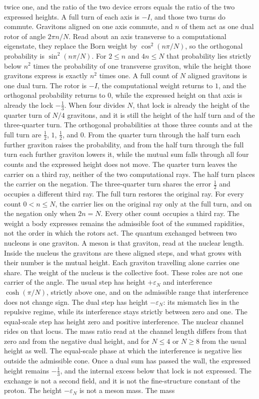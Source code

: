 \documentclass[a4paper]{article}
\begin{document}
twice one, and the ratio of the two device errors equals the ratio of the two expressed heights. A full turn of each axis is \(-I\), and those two turns do commute. Gravitons aligned on one axis commute, and \(n\) of them act as one dual rotor of angle \(2\pi n/N\). Read about an axis transverse to a computational eigenstate, they replace the Born weight by \(\cos^2(n\pi/N)\), so the orthogonal probability is \(\sin^2(n\pi/N)\). For \(2\le n\) and \(4n\le N\) that probability lies strictly below \(n^2\) times the probability of one transverse graviton, while the height those gravitons express is exactly \(n^2\) times one. A full count of \(N\) aligned gravitons is one dual turn. The rotor is \(-I\), the computational weight returns to \(1\), and the orthogonal probability returns to \(0\), while the expressed height on that axis is already the lock \(-\frac13\). When four divides \(N\), that lock is already the height of the quarter turn of \(N/4\) gravitons, and it is still the height of the half turn and of the three-quarter turn. The orthogonal probabilities at those three counts and at the full turn are \(\frac12\), \(1\), \(\frac12\), and \(0\). From the quarter turn through the half turn each further graviton raises the probability, and from the half turn through the full turn each further graviton lowers it, while the mutual sum falls through all four counts and the expressed height does not move. The quarter turn leaves the carrier on a third ray, neither of the two computational rays. The half turn places the carrier on the negation. The three-quarter turn shares the error \(\frac12\) and occupies a different third ray. The full turn restores the original ray. For every count \(0<n\le N\), the carrier lies on the original ray only at the full turn, and on the negation only when \(2n=N\). Every other count occupies a third ray. The weight a body expresses remains the admissible foot of the summed rapidities, not the order in which the rotors act. The quantum exchanged between two nucleons is one graviton. A meson is that graviton, read at the nuclear length. Inside the nucleus the gravitons are these aligned steps, and what grows with their number is the mutual height. Each graviton travelling alone carries one share. The weight of the nucleus is the collective foot. These roles are not one carrier of the angle. The usual step has height \(+\varepsilon_N\) and interference \(\cosh(\pi/N)\), strictly above one, and on the admissible range that interference does not change sign. The dual step has height \(-\varepsilon_N\): its mismatch lies in the repulsive regime, while its interference stays strictly between zero and one. The equal-scale step has height zero and positive interference. The nuclear channel rides on that locus. The mass ratio read at the channel length differs from that zero and from the negative dual height, and for \(N\le 4\) or \(N\ge 8\) from the usual height as well. The equal-scale phase at which the interference is negative lies outside the admissible cone. Once a dual sum has passed the wall, the expressed height remains \(-\frac13\), and the internal excess below that lock is not expressed. The exchange is not a second field, and it is not the fine-structure constant of the proton. The height \(-\varepsilon_N\) is not a meson mass. The mass 
\end{document}
